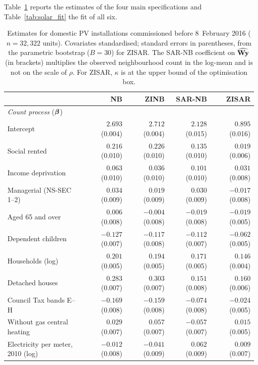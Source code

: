 Table~\ref{tab:solar_estimates} reports the estimates of the four main specifications and Table~\ref{tab:solar_fit} the fit of all six.

\begin{table}[htbp]
\centering
\caption{Estimates for domestic PV installations commissioned before 8~February 2016 ($n=32{,}322$ units). Covariates standardised; standard errors in parentheses, from the parametric bootstrap ($B = 30$) for ZISAR. The SAR-NB coefficient on $\widehat{\mathbf{W}\mathbf{y}}$ (in brackets) multiplies the observed neighbourhood count in the log-mean and is not on the scale of $\rho$. For ZISAR, $\kappa$ is at the upper bound of the optimisation box.}\label{tab:solar_estimates}
\footnotesize
\begin{tabular}{lrrrr}
\toprule
 & NB & ZINB & SAR-NB & ZISAR \\
\midrule
\multicolumn{5}{l}{\textit{Count process} ($\boldsymbol{\beta}$)} \\
Intercept                          & $2.693$ (0.004) & $2.712$ (0.004) & $2.128$ (0.015) & $0.895$ (0.016) \\
Social rented                      & $0.216$ (0.010) & $0.226$ (0.010) & $0.135$ (0.010) & $0.019$ (0.006) \\
Income deprivation                 & $0.063$ (0.010) & $0.036$ (0.010) & $0.101$ (0.010) & $0.031$ (0.008) \\
Managerial (NS-SEC 1--2)           & $0.034$ (0.009) & $0.019$ (0.009) & $0.030$ (0.009) & $-0.017$ (0.008) \\
Aged 65 and over                   & $0.006$ (0.008) & $-0.004$ (0.008) & $-0.019$ (0.008) & $-0.019$ (0.005) \\
Dependent children                 & $-0.127$ (0.007) & $-0.117$ (0.008) & $-0.112$ (0.007) & $-0.062$ (0.005) \\
Households (log)                   & $0.201$ (0.005) & $0.194$ (0.005) & $0.171$ (0.005) & $0.146$ (0.004) \\
Detached houses                    & $0.283$ (0.007) & $0.303$ (0.007) & $0.151$ (0.008) & $0.160$ (0.006) \\
Council Tax bands E--H             & $-0.169$ (0.008) & $-0.159$ (0.008) & $-0.074$ (0.008) & $-0.024$ (0.005) \\
Without gas central heating        & $0.029$ (0.007) & $0.057$ (0.007) & $-0.057$ (0.007) & $0.015$ (0.005) \\
Electricity per meter, 2010 (log)  & $-0.012$ (0.008) & $-0.041$ (0.009) & $0.062$ (0.009) & $0.009$ (0.007) \\

\end{tabular}
\end{table}
